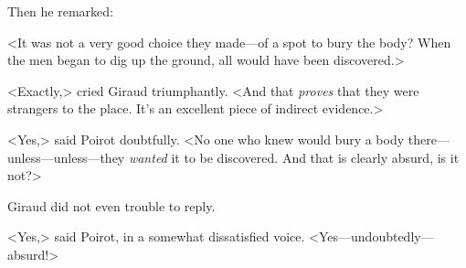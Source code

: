  Then he remarked: 

 <It was not a very good choice they made—of a spot to bury the body? When the men began to dig up the ground, all would have been discovered.> 

 <Exactly,> cried Giraud triumphantly. <And that \emph{proves} that they were strangers to the place. It's an excellent piece of indirect evidence.> 

 <Yes,> said Poirot doubtfully. <No one who knew would bury a body there—unless—unless—they \emph{wanted} it to be discovered. And that is clearly absurd, is it not?> 

 Giraud did not even trouble to reply. 

 <Yes,> said Poirot, in a somewhat dissatisfied voice. <Yes—undoubtedly—absurd!>